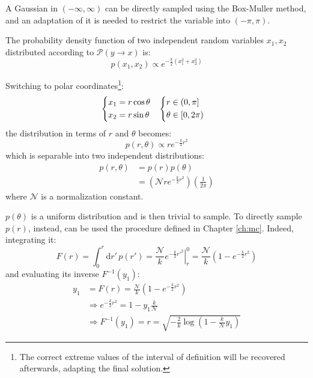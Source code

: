 A Gaussian in $(-\infty,\infty)$ can be directly sampled using the Box-Muller method,
and an adaptation of it is needed to restrict the variable into $(-\pi,\pi)$.

The probability density function of two independent random variables $x_1,x_2$ distributed according to $\mathcal P(y\to x)$ is:
\begin{equation}\label{eq:gauss2d}
    p(x_1,x_2) \propto e^{-\frac{k}{2}(x_1^2+x_2^2)}
\end{equation}

Switching to polar coordinates\footnote{The correct extreme values of the interval of definition will be recovered afterwards, adapting the final solution.}:
\[\begin{aligned}
    &\begin{dcases}
        x_1 = r \cos\theta \\
        x_2 = r \sin\theta
    \end{dcases}
    &
    \begin{dcases}
        r \in (0,\pi] \\
        \theta \in [0,2\pi)
    \end{dcases}&
\end{aligned}\]
the distribution in terms of $r$ and $\theta$ becomes:
\[
    p(r,\theta) \propto re^{-\frac{k}{2}r^2}
\]
which is separable into two independent distributions:
\[\begin{aligned}
    p(r,\theta) &= p(r)p(\theta) \\
                &= \left(\mathcal Nre^{-\frac{k}{2}r^2}\right)\left(\frac{1}{2\pi}\right)
\end{aligned}\]
where $\mathcal N$ is a normalization constant.

$p(\theta)$ is a uniform distribution and is then trivial to sample.
To directly sample $p(r)$, instead, can be used the procedure defined in Chapter \ref{ch:mc}.
Indeed, integrating it:
\[
    F(r) = \int_0^r\mathrm dr'\,p(r') = \frac{\mathcal N}{k}\left.e^{-\frac{k}{2}{r'}^2}\right|_r^0 = \frac{\mathcal N}{k}\left(1-e^{-\frac{k}{2}r^2}\right)
\]
and evaluating its inverse $F^{-1}(y_1)$:
\[\begin{aligned}
    y_1 &= F(r) = \frac{\mathcal N}{k}\left(1-e^{-\frac{k}{2}r^2}\right) \\
        &\Rightarrow e^{-\frac{k}{2}r^2} = 1 - y_1\frac{k}{\mathcal N} \\
        &\Rightarrow F^{-1}(y_1) = r = \sqrt{-\frac{2}{k}\log\left(1-\frac{k}{\mathcal N}y_1\right)}
\end{aligned}\]

